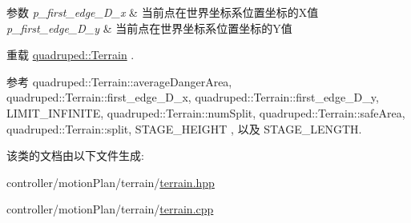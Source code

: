\begin{DoxyParams}{参数}
{\em p\+\_\+first\+\_\+edge\+\_\+\+D\+\_\+x} & 当前点在世界坐标系位置坐标的\+X值 \\
\hline
{\em p\+\_\+first\+\_\+edge\+\_\+\+D\+\_\+y} & 当前点在世界坐标系位置坐标的\+Y值 \\
\hline
\end{DoxyParams}


重载 \hyperlink{classquadruped_1_1Terrain}{quadruped\+::\+Terrain} .



参考 quadruped\+::\+Terrain\+::average\+Danger\+Area, quadruped\+::\+Terrain\+::first\+\_\+edge\+\_\+\+D\+\_\+x, quadruped\+::\+Terrain\+::first\+\_\+edge\+\_\+\+D\+\_\+y, L\+I\+M\+I\+T\+\_\+\+I\+N\+F\+I\+N\+I\+TE, quadruped\+::\+Terrain\+::num\+Split, quadruped\+::\+Terrain\+::safe\+Area, quadruped\+::\+Terrain\+::split, S\+T\+A\+G\+E\+\_\+\+H\+E\+I\+G\+HT , 以及 S\+T\+A\+G\+E\+\_\+\+L\+E\+N\+G\+TH.



该类的文档由以下文件生成\+:\begin{DoxyCompactItemize}
\item 
controller/motion\+Plan/terrain/\hyperlink{terrain_8hpp}{terrain.\+hpp}\item 
controller/motion\+Plan/terrain/\hyperlink{terrain_8cpp}{terrain.\+cpp}\end{DoxyCompactItemize}
